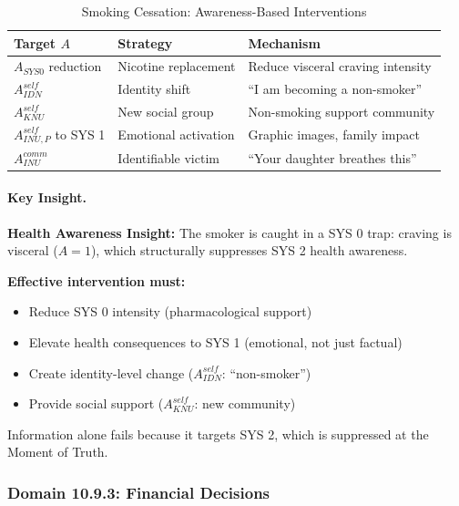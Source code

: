 \begin{table}[htbp]
\centering
\caption{Smoking Cessation: Awareness-Based Interventions}
\label{tab:smoking-intervention}
\renewcommand{\arraystretch}{1.3}
\begin{tabular}{@{}lll@{}}
\toprule
\textbf{Target $A$} & \textbf{Strategy} & \textbf{Mechanism} \\
\midrule
$A_{SYS0}$ reduction & Nicotine replacement & Reduce visceral craving intensity \\
$A^{self}_{IDN}$ & Identity shift & ``I am becoming a non-smoker'' \\
$A^{self}_{KNU}$ & New social group & Non-smoking support community \\
$A^{self}_{INU,P}$ to SYS 1 & Emotional activation & Graphic images, family impact \\
$A^{comm}_{INU}$ & Identifiable victim & ``Your daughter breathes this'' \\
\bottomrule
\end{tabular}
\end{table}

\paragraph{Key Insight.}
\begin{tcolorbox}[colback=yellow!10!white, colframe=yellow!50!black]
\textbf{Health Awareness Insight:}
The smoker is caught in a SYS 0 trap: craving is visceral ($A = 1$), 
which structurally suppresses SYS 2 health awareness.

\textbf{Effective intervention must:}
\begin{itemize}
\item Reduce SYS 0 intensity (pharmacological support)
\item Elevate health consequences to SYS 1 (emotional, not just factual)
\item Create identity-level change ($A^{self}_{IDN}$: ``non-smoker'')
\item Provide social support ($A^{self}_{KNU}$: new community)
\end{itemize}
Information alone fails because it targets SYS 2, which is suppressed at 
the Moment of Truth.
\end{tcolorbox}

\subsubsection{Domain 10.9.3: Financial Decisions}
\label{subsubsec:awareness-finance}

